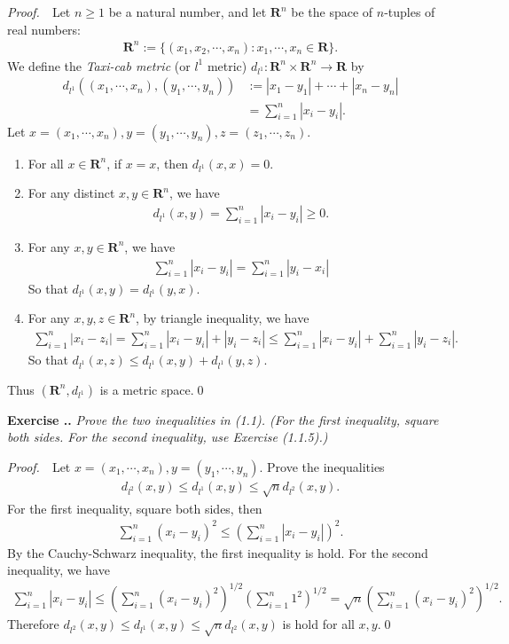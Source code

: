 \documentclass{book}
\newcommand{\pff}{\vspace{.25em}\noindent\emph{Proof.}~~}
\newcounter{Exercise}[section]
\renewcommand{\theExercise}{\thesection.\arabic{Exercise}.}
\newcommand{\new}{\vspace{1.5em}\noindent\textbf{Exercise \stepcounter{Exercise}\textbf{\theExercise}} }
\begin{document}
\pff Let $n\geq 1$ be a natural number, and let $\mathbf{R}^n$ be the space of $n$-tuples of real numbers:
\begin{align*}
    \mathbf{R}^n:=\{(x_1,x_2,\cdots,x_n):x_1,\cdots,x_n\in\mathbf{R}\}.
\end{align*}
We define the \emph{Taxi-cab metric} (or $l^1$ metric) $d_{l^1}:\mathbf{R}^n\times\mathbf{R}^n\to\mathbf{R}$ by
\begin{align*}
    d_{l^1}((x_1,\cdots,x_n),(y_1,\cdots,y_n))
    &:=|x_1-y_1|+\cdots+|x_n-y_n|\\
    &=\sum_{i=1}^{n}|x_i-y_i|.
\end{align*}
Let $x=(x_1,\cdots,x_n),y=(y_1,\cdots,y_n),z=(z_1,\cdots,z_n)$.
    \begin{enumerate}
        \item For all $x\in\mathbf{R}^n$, if $x=x$, then $d_{l^1}(x,x)=0$.
        \item For any distinct $x,y\in\mathbf{R}^n$, we have
            \begin{align*}
                d_{l^1}(x,y)=\sum_{i=1}^{n}|x_i-y_i|\geq 0.
            \end{align*}
        \item For any $x,y\in\mathbf{R}^n$, we have
            \begin{align*}
                \sum_{i=1}^{n}|x_i-y_i|=\sum_{i=1}^{n}|y_i-x_i|
            \end{align*}
        So that $d_{l^1}(x,y)=d_{l^1}(y,x)$.
        \item For any $x,y,z\in\mathbf{R}^n$, by triangle inequality, we have
            \begin{align*}
                \sum_{i=1}^{n}|x_i-z_i|
                =\sum_{i=1}^{n}|x_i-y_i|+|y_i-z_i|
                \leq\sum_{i=1}^{n}|x_i-y_i|+\sum_{i=1}^{n}|y_i-z_i|.
            \end{align*}
        So that $d_{l^1}(x,z)\leq d_{l^1}(x,y)+d_{l^1}(y,z)$.
    \end{enumerate}
Thus $(\mathbf{R}^n,d_{l^1})$ is a metric space.\qed

\new\emph{Prove the two inequalities in (1.1). (For the first inequality, square both sides. For the second inequality, use Exercise (1.1.5).)}

\pff Let $x=(x_1,\cdots,x_n),y=(y_1,\cdots,y_n)$. Prove the inequalities
    \begin{align*}
        d_{l^2}(x,y)\leq d_{l^1}(x,y)\leq\sqrt{n}d_{l^2}(x,y).
    \end{align*}
For the first inequality, square both sides, then
    \begin{align*}
        \sum_{i=1}^{n}(x_i-y_i)^2\leq\left(\sum_{i=1}^{n}|x_i-y_i|\right)^2.
    \end{align*}
By the Cauchy-Schwarz inequality, the first inequality is hold. For the second inequality, we have
    \begin{align*}
        \sum_{i=1}^{n}|x_i-y_i|\leq\left(\sum_{i=1}^{n}(x_i-y_i)^2\right)^{1/2}\left(\sum_{i=1}^{n}1^2\right)^{1/2}=\sqrt{n}\left(\sum_{i=1}^{n}(x_i-y_i)^2\right)^{1/2}.
    \end{align*}
Therefore $d_{l^2}(x,y)\leq d_{l^1}(x,y)\leq\sqrt{n}d_{l^2}(x,y)$ is hold for all $x,y$.\qed
\end{document}
